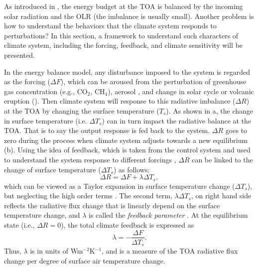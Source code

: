  As introduced in , the energy budget at the TOA is balanced by the incoming solar radiation and the OLR (the imbalance is usually small). Another problem is how to understand the behaviors that the climate system responds to perturbations? In this section, a framework to understand such characters of climate system, including the forcing, feedback, and climate sensitivity will be presented.
 
 In the energy balance model, any disturbance imposed to the system is regarded as the forcing ($\Delta F$), which can be aroused from the perturbation of greenhouse gas concentration (e.g., CO$_2$, CH$_4$), aerosol \citep{Ramanathan2001aerosols}, and change in solar cycle \citep{Frohlich2004solar} or volcanic eruption (). Then climate system will response to this radiative imbalance ($\Delta R$) at the TOA  by changing the surface temperature ($T_s$). As shown in a, the change in surface temperature (i.e. $\Delta T_s$) can in turn impact the radiative balance at the TOA. That is to say the output response is fed back to the system. $\Delta R$ goes to zero during the process when climate system adjusts towards a new equilibrium (b). Using the idea of feedback, which is taken from the control system and used to understand the system response to different forcings \citep{Stephens2005cloud},
$\Delta R$ can be linked to the change of surface temperature ($\Delta T_s$) as follows:
\begin{equation}
    \Delta R = \Delta F + \lambda \Delta T_s,
    \label{eq:imbalance_forcing_lambda}
\end{equation}
which can be viewed as a Taylor expansion in surface temperature change ($\Delta T_s$), but neglecting the high order terms \citep{Feldl2013a}. The second term, $\lambda \Delta T_s$, on right hand side reflects the radiative flux change that is linearly depend on the surface temperature change, and $\lambda$ is called the \textit{feedback parameter} \citep{Gregory2004}. At the equilibrium state (i.e., $\Delta R=0$), the total climate feedback is expressed as 
\begin{equation}
    \lambda = -\frac{\Delta F}{\Delta T_s}.
\end{equation}
Thus, $\lambda$ is in units of Wm$^{-2}$K$^{-1}$, and is a measure of the TOA radiative flux change per degree of surface air temperature change. 

